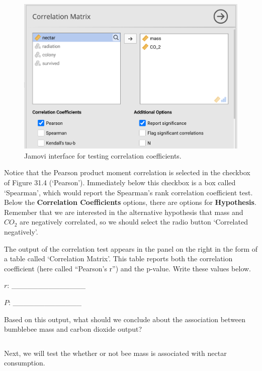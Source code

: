 \documentclass[
  openany]{krantz}
\begin{document}
\begin{figure}
\includegraphics[width=1\linewidth]{img/jamovi_correlation_interface} \caption{Jamovi interface for testing correlation coefficients.}\label{fig:unnamed-chunk-135}
\end{figure}

Notice that the Pearson product moment correlation is selected in the checkbox of Figure 31.4 (`Pearson').
Immediately below this checkbox is a box called `Spearman', which would report the Spearman's rank correlation coefficient test.
Below the \textbf{Correlation Coefficients} options, there are options for \textbf{Hypothesis}.
Remember that we are interested in the alternative hypothesis that mass and \(CO_{2}\) are negatively correlated, so we should select the radio button `Correlated negatively'.

The output of the correlation test appears in the panel on the right in the form of a table called `Correlation Matrix'.
This table reports both the correlation coefficient (here called ``Pearson's r'') and the p-value.
Write these values below.

\(r\): \_\_\_\_\_\_\_\_\_\_\_\_\_\_

\(P\): \_\_\_\_\_\_\_\_\_\_\_\_\_

Based on this output, what should we conclude about the association between bumblebee mass and carbon dioxide output?

\begin{verbatim}

\end{verbatim}

Next, we will test the whether or not bee mass is associated with nectar consumption.
\end{document}
